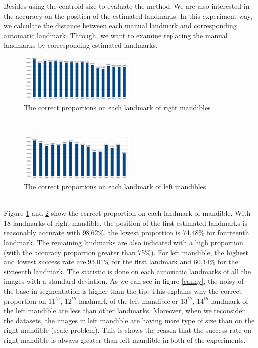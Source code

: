 \documentclass[twoside,twocolumn,10pt]{article}
\begin{document}
Besides using the centroid size to evaluate the method. We are also
interested in the accuracy on the position of the estimated landmarks. In this experiment
way, we calculate the distance between each manual landmark and
corresponding automatic landmark. Through, we want to examine replacing the manual landmarks by corresponding estimated landmarks.
\begin{figure}[htb]
    \centering
    \includegraphics[width=0.5\textwidth]{./images/md_chartlms}
    \caption{The correct proportions on each landmark of right mandibles }
    \label{figmdresultlm}
\end{figure}~\\
\begin{figure}[htb]
    \centering
    \includegraphics[width=0.5\textwidth]{./images/mg_chartlms}
    \caption{The correct proportions on each landmark of left mandibles }
    \label{figmgresultlm}
\end{figure}~\\
Figure \ref{figmdresultlm} and \ref{figmgresultlm} show the correct proportion on each landmark of mandible. With 18 landmarks of right mandible, the position of the first estimated landmarks is reasonably accurate with 98.62\%, the lowest proportion is 74,48\% for fourteenth landmark. The remaining landmarks are also indicated with a high proportion (with the accuracy proportion greater than 75\%). For left mandible, the highest and lowest success rate are 93,01\% for the first landmark and 60,14\% for the sixteenth landmark. The statistic is done on each automatic landmarks of all the images with a standard deviation\cite{bland1996statistics}. As we can see in figure \ref{canny}, the noisy of the base in segmentation is higher than the tip. This explains why the correct proportion on $11^{th}$, $12^{th}$ landmark of the left mandible or $13^{th}$, $14^{th}$ landmark of the left mandible are less than other landmarks. Moreover, when we reconsider the datasets, the images in left mandible are having more type of size than on the right mandible (scale problem). This is shows the reason that the success rate on right mandible is always greater than left mandible in both of the experiments.\\
\end{document}
